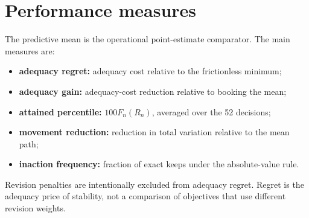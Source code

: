 \documentclass[
  10pt,
]{article}
\providecommand{\tightlist}{%
  \setlength{\itemsep}{0pt}\setlength{\parskip}{0pt}}
\begin{document}
\hypertarget{performance-measures}{%
\section{Performance measures}\label{performance-measures}}

The predictive mean is the operational point-estimate comparator. The
main measures are:

\begin{itemize}
\tightlist
\item
  \textbf{adequacy regret:} adequacy cost relative to the frictionless
  minimum;
\item
  \textbf{adequacy gain:} adequacy-cost reduction relative to booking
  the mean;
\item
  \textbf{attained percentile:} \(100F_n(R_n)\), averaged over the 52
  decisions;
\item
  \textbf{movement reduction:} reduction in total variation relative to
  the mean path;
\item
  \textbf{inaction frequency:} fraction of exact keeps under the
  absolute-value rule.
\end{itemize}

Revision penalties are intentionally excluded from adequacy regret.
Regret is the adequacy price of stability, not a comparison of
objectives that use different revision weights.
\end{document}
